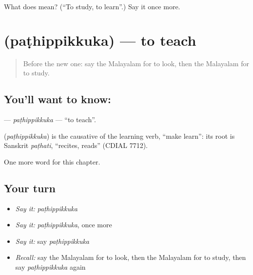 \begin{tcolorbox}[breakable,colback=teal!4,colframe=teal!35!black,title={Before you move on}]
What does  mean? (\textquotedblleft{}To study, to learn\textquotedblright{}.) Say it once more.
\end{tcolorbox}
\section[\texorpdfstring{\ml{പഠിപ്പിക്കുക} (paṭhippikkuka)}{പഠിപ്പിക്കുക (paṭhippikkuka)}]{ (paṭhippikkuka) — to teach}

\label{lesson:ML-C173-pathippikkuka}



\begin{quote}
Before the new one: say the Malayalam for to look, then the Malayalam for to study.
\end{quote}

\subsection*{You'll want to know: }
\textbf{} — \emph{paṭhippikkuka} — \textquotedblleft{}to teach\textquotedblright{}.

\begin{cousinweb}
\textbf{} (\emph{paṭhippikkuka}) is the causative of the learning verb, \textquotedblleft{}make learn\textquotedblright{}: its root is Sanskrit \emph{paṭhati}, \textquotedblleft{}recites, reads\textquotedblright{} (CDIAL 7712).
\end{cousinweb}

\begin{grammarlens}[title={What you've built}]
One more word for this chapter.
\end{grammarlens}

\subsection*{Your turn}
\begin{itemize}
\raggedright
  \item \emph{Say it:} \emph{paṭhippikkuka}
  \item \emph{Say it:} \emph{paṭhippikkuka}, once more
  \item \emph{Say it:} say \emph{paṭhippikkuka}
  \item \emph{Recall:} say the Malayalam for to look, then the Malayalam for to study, then say \emph{paṭhippikkuka} again
\end{itemize}

